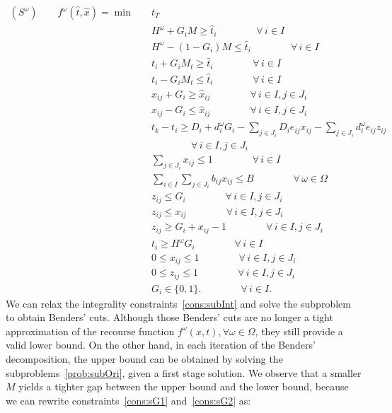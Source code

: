 \documentclass[11pt]{article}
\begin{document}
	\begin{subequations}
		\label{prob:subOri}
		\begin{align}
		(S^\omega) \qquad f^\omega(\hat{t},\hat{x}) = \min \quad & t_T \\
		& H^\omega + G_i M \geq \hat{t}_i \qquad \qquad \forall \,i \in I \label{cons:sG1}\\
		& H^\omega - (1 - G_i) M \leq \hat{t}_i \qquad \qquad \forall \,i \in I \label{cons:sG2}\\
		& t_i + G_i M_t \geq \hat{t}_i \qquad \qquad \forall \,i \in I \label{cons:stG1}\\
		& t_i - G_i M_t \leq \hat{t}_i \qquad \qquad \forall \,i \in I \label{cons:stG2}\\
		& x_{ij} + G_i \geq \hat{x}_{ij} \qquad \qquad \forall \,i \in I, j \in J_i \label{cons:sxG1}\\
		& x_{ij} - G_i \leq \hat{x}_{ij} \qquad \qquad \forall \,i \in I, j \in J_i \label{cons:sxG2}\\
		& t_k - t_i \geq D_i + d_i^\omega G_i -\sum_{j \in J_i} D_i e_{ij} x_{ij} - \sum_{j \in J_i} d_i^\omega e_{ij} z_{ij} \nonumber \\ 
		& \qquad \qquad \forall \,i \in I, j \in J_i \label{cons:subSep}\\
		& \sum_{j \in J_i} x_{ij} \leq 1 \qquad \qquad \forall \,i \in I \label{cons:subBudget1}\\
		& \sum_{i \in I}\sum_{j \in J_i} b_{ij}x_{ij} \leq B \qquad \qquad \forall \,\omega \in \Omega \label{cons:subBudget}\\
		& z_{ij} \leq G_i \qquad \qquad \forall \,i \in I, j \in J_i \label{cons:sublinearize1}\\
		& z_{ij} \leq x_{ij} \qquad \qquad \forall \,i \in I, j \in J_i \label{cons:sublinearize2}\\
		& z_{ij} \geq G_i + x_{ij} - 1 \qquad \qquad \forall \,i \in I, j \in J_i \label{cons:sublinearize3}\\
		& t_i \geq H^\omega G_i \qquad \qquad \forall\, i \in I \label{cons:subH}\\
		& 0 \leq x_{ij} \leq 1 \qquad \qquad \forall \,i \in I, j \in J_i\\
		& 0 \leq z_{ij} \leq 1 \qquad \qquad \forall \,i \in I, j \in J_i\\
		& G_i \in \{0,1\}. \qquad \qquad \forall \,i \in I. \label{cons:subInt}
		\end{align}
	\end{subequations}
	We can relax the integrality constraints~\eqref{cons:subInt} and solve the subproblem to obtain Benders' cuts. Although those Benders' cuts are no longer a tight approximation of the recourse function \(f^\omega(x,t), \forall \omega \in \Omega\), they still provide a valid lower bound. On the other hand, in each iteration of the Benders' decomposition, the upper bound can be obtained by solving the subproblems~\eqref{prob:subOri}, given a first stage solution. We observe that a smaller \(M\) yields a tighter gap between the upper bound and the lower bound, because we can rewrite constraints~\eqref{cons:sG1} and~\eqref{cons:sG2} as:
\end{document}
